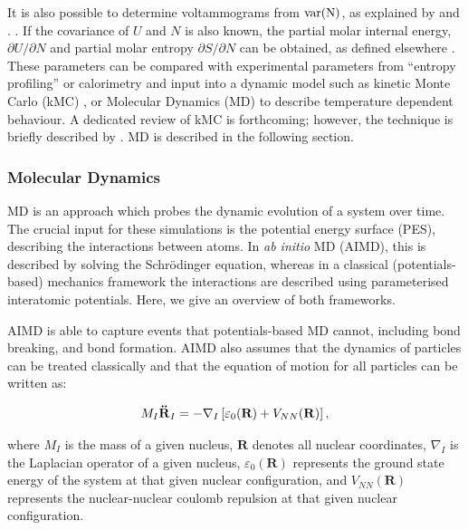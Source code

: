 \documentclass[../main.tex]{subfiles}
\begin{document}
It is also possible to determine voltammograms from $\rm{var}(N)$, as explained by \citeauthor{darling1999} and \citeauthor{mercer_influence_2017}. \cite{darling1999,mercer_influence_2017}. If the covariance of $U$ and $N$ is also known, the partial molar internal energy, $\partial{U}/\partial{N}$ and partial molar entropy $\partial{S}/\partial{N}$ can be obtained, as defined elsewhere \cite{mercer_influence_2017,Kim2001h}. These parameters can be compared with experimental parameters from ``entropy profiling'' or calorimetry \cite{mercer_influence_2017,schlueter_quantifying_2018, Mercer2019,THOMAS2003844,zhang2017} and input into a dynamic model such as kinetic Monte Carlo (kMC) \cite{gavilan-arriazu_kinetic_2020,darling1999,gavilan-arriazu_effect_2020,persson2010}, or Molecular Dynamics (MD) to describe temperature dependent behaviour. A dedicated review of kMC is forthcoming; however, the technique is briefly described by \citeauthor{VanderVen2020}.\cite{VanderVen2020} MD is described in the following section.

\subsubsection{Molecular Dynamics}
\label{sec:molecular_dynamics}
MD is an approach which probes the dynamic evolution of a system over time. The crucial input for these simulations is the potential energy surface (PES), describing the interactions between atoms. In \textit{ab initio} MD (AIMD), this is described by solving the Schr\"{o}dinger equation, whereas in a classical (potentials-based) mechanics framework the interactions are described using parameterised interatomic potentials. Here, we give an overview of both frameworks.

AIMD is able to capture events that potentials-based MD cannot, including bond breaking, and bond formation. AIMD also assumes that the dynamics of particles can be treated classically and that the equation of motion for all particles can be written as:

\begin{equation}
    \label{eq:eom}
    M_I \textrm{\textbf{\"{R}}} _I=-\nabla_I\left[ \varepsilon_0(\textbf{R})+V_{NN}(\mathbf{R})\right],
\end{equation}

where $M_I$ is the mass of a given nucleus, $\textbf{R}$ denotes all nuclear coordinates, $\nabla_I$ is the Laplacian operator of a given nucleus, $\varepsilon_0(\textbf{R})$ represents the ground state energy of the system at that given nuclear configuration, and $V_{NN}(\textbf{R})$ represents the nuclear-nuclear coulomb repulsion at that given nuclear configuration.
\end{document}

